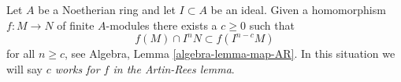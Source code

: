 Let $A$ be a Noetherian ring and let $I \subset A$ be an ideal. Given a
homomorphism $f : M \to N$ of finite $A$-modules there exists a $c \geq 0$
such that
$$
f(M) \cap I^nN \subset f(I^{n - c}M)
$$
for all $n \geq c$, see Algebra, Lemma \ref{algebra-lemma-map-AR}. In this
situation we will say {\it $c$ works for $f$ in the Artin-Rees lemma}.

